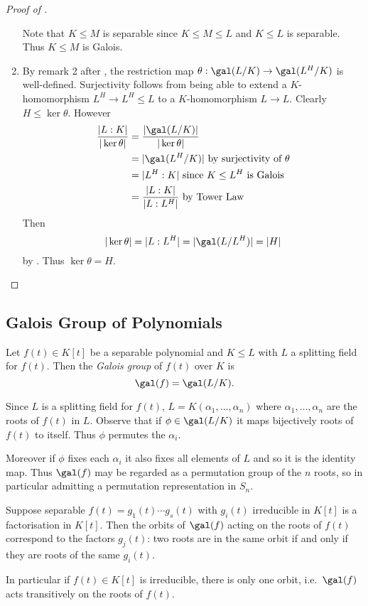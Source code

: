 \documentclass[a4paper]{article}
\begin{document}
\begin{proof}[Proof of ]
\begin{enumerate}
    Note that \(K \leq M\) is separable since \(K \leq M \leq L\) and \(K \leq L\) is separable. Thus \(K \leq M\) is Galois.
  \item By remark 2 after , the restriction map \(\theta: \gal(L/K) \to \gal(L^H/K)\) is well-defined. Surjectivity follows from being able to extend a \(K\)-homomorphism \(L^H \to L^H \leq L\) to a \(K\)-homomorphism \(L \to L\). Clearly \(H \leq \ker \theta\). However
    \begin{align*}
      \frac{|L:K|}{|\ker \theta|} &= \frac{|\gal(L/K)|}{|\ker \theta|} \\
                                  &= |\gal(L^H/K)| \text{ by surjectivity of \(\theta\)} \\
                                  &= |L^H:K| \text{ since \(K \leq L^H\) is Galois} \\
                                  &= \frac{|L:K|}{|L:L^H|} \text{ by Tower Law}
    \end{align*}
    Then
    \[
      |\ker \theta| = |L:L^H| = |\gal(L/L^H)| = |H|
    \]
    by . Thus \(\ker \theta = H\).
  \end{enumerate}
\end{proof}

\subsection{Galois Group of Polynomials}

\begin{definition}
  Let \(f(t) \in K[t]\) be a separable polynomial and \(K \leq L\) with \(L\) a splitting field for \(f(t)\). Then the \emph{Galois group} of \(f(t)\) over \(K\) is
  \[
    \gal(f) = \gal(L/K).
  \]
\end{definition}

Since \(L\) is a splitting field for \(f(t)\), \(L = K(\alpha_1, \dots, \alpha_n)\) where \(\alpha_1, \dots, \alpha_n\) are the roots of \(f(t)\) in \(L\). Observe that if \(\phi \in \gal(L/K)\) it maps bijectively roots of \(f(t)\) to itself. Thus \(\phi\) permutes the \(\alpha_i\).

Moreover if \(\phi\) fixes each \(\alpha_i\) it also fixes all elements of \(L\) and so it is the identity map. Thus \(\gal(f)\) may be regarded as a permutation group of the \(n\) roots, so in particular admitting a permutation representation in \(S_n\).

\begin{lemma}
  \label{lem:galois orbits}
  Suppose separable \(f(t) = g_1(t) \cdots g_s(t)\) with \(g_i(t)\) irreducible in \(K[t]\) is a factorisation in \(K[t]\). Then the orbits of \(\gal(f)\) acting on the roots of \(f(t)\) correspond to the factors \(g_j(t)\): two roots are in the same orbit if and only if they are roots of the same \(g_i(t)\).

  In particular if \(f(t) \in K[t]\) is irreducible, there is only one orbit, i.e.\ \(\gal(f)\) acts transitively on the roots of \(f(t)\).
\end{lemma}
\end{document}
